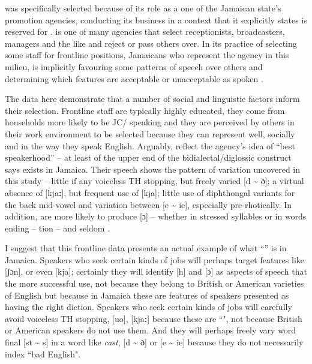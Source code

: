  was specifically selected because of its role as a one of the Jamaican state’s promotion agencies, conducting its business in a context that it explicitly states is reserved for .   is one of many agencies that select receptionists, broadcasters, managers and the like and reject or pass others over.  In its practice of selecting some staff for frontline positions, Jamaicans who represent the agency in this milieu,  is implicitly favouring some patterns of speech over others and determining which features are acceptable or unacceptable as spoken .

The data here demonstrate that a number of social and linguistic factors inform their selection.  Frontline staff are typically highly educated, they come from households more likely to be JC\slash {} speaking and they are perceived by others in their work environment to be selected because they can represent  well, socially and in the way they speak English.  Arguably,  reflect the agency’s idea of “best speakerhood” \citep[286]{Silverstein1996} – at least of the upper end of the bidialectal\slash diglossic construct  says exists in Jamaica.  Their speech shows the pattern of variation uncovered in this study – little if any voiceless TH stopping, but freely varied [d {\textasciitilde} ð]; a virtual absence of [kja\textbf{:}], but frequent use of [kja]; little use of diphthongal variants for the back mid-vowel and variation between [e {\textasciitilde} ie], especially pre-rhotically.  In addition,  are more likely to produce [ɔ] – whether in stressed syllables or in words ending – tion – and seldom .    

I suggest that this frontline data presents an actual example of what “” is in Jamaica.  Speakers who seek certain kinds of jobs will perhaps target features like [ʃɔn], or even [kja]; certainly they will identify [h] and [ɔ] as aspects of speech that the more successful use, not because they belong to British or American varieties of English but because in Jamaica these are features of speakers presented as having the right diction.  Speakers who seek certain kinds of jobs will carefully avoid voiceless TH stopping, [uo], [kja\textbf{:}] because these are ``", not because British or American speakers do not use them.  And they will perhaps freely vary word final [st {\textasciitilde} s] in a word like \textit{cast}, [d {\textasciitilde} ð] or [e {\textasciitilde} ie] because they do not necessarily index ``bad English".    

